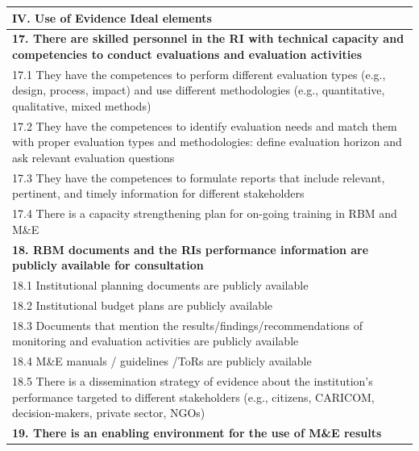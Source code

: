 \documentclass[
  10pt,
]{book}
\begin{document}
\begin{table}
\centering
\begin{tabular}[t]{l}
\hline
IV. Use of Evidence Ideal elements\\
\hline
\multicolumn{1}{l}{\textbf{17. There are skilled personnel in the RI with technical capacity and competencies to conduct evaluations and evaluation activities}}\\
\hline
\hspace{1em}17.1 They have the competences to perform different evaluation types (e.g., design, process, impact) and use different methodologies (e.g., quantitative, qualitative, mixed methods)\\
\hline
\hspace{1em}17.2 They have the competences to identify evaluation needs and match them with proper evaluation types and methodologies: define evaluation horizon and ask relevant evaluation questions\\
\hline
\hspace{1em}17.3 They have the competences to formulate reports that include relevant, pertinent, and timely information for different stakeholders\\
\hline
\hspace{1em}17.4 There is a capacity strengthening plan for on-going training in RBM and M\&E\\
\hline
\multicolumn{1}{l}{\textbf{18. RBM documents and the RIs performance information are publicly available for consultation}}\\
\hline
\hspace{1em}\hspace{1em}18.1 Institutional planning documents are publicly available\\
\hline
\hspace{1em}18.2 Institutional budget plans are publicly available\\
\hline
\hspace{1em}18.3 Documents that mention the results/findings/recommendations of monitoring and evaluation activities are publicly available\\
\hline
\hspace{1em}18.4 M\&E manuals / guidelines /ToRs are publicly available\\
\hline
18.5 There is a dissemination strategy of evidence about the institution’s performance targeted to different stakeholders (e.g., citizens, CARICOM, decision-makers, private sector, NGOs)\\
\hline
\multicolumn{1}{l}{\textbf{19. There is an enabling environment for the use of M\&E results}}\\

\end{tabular}
\end{table}
\end{document}
